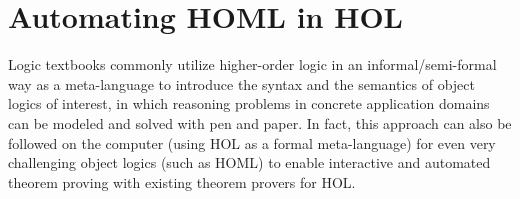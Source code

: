 \documentclass{article}
\begin{document}








\section{Automating HOML in HOL}\label{sec:homlinhol}

Logic textbooks %
commonly utilize higher-order logic in an informal/semi-formal way as
a meta-language to introduce the syntax and the semantics of object
logics of interest, in which reasoning problems in concrete
application domains can be modeled and solved with pen and paper. In
fact, this approach can also be followed on the computer (using HOL as
a formal meta-language) for even very challenging object logics (such
as HOML) to enable interactive and automated theorem proving with
existing theorem provers for HOL.

\end{document}
